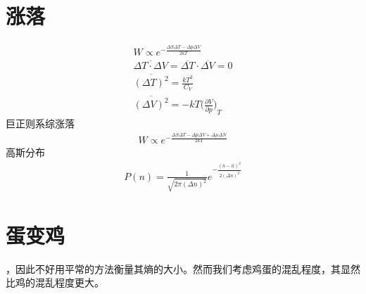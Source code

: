 \documentclass[a4paper,12pt]{article}
\newcommand{\myPartial}[3]{{\bigg(\frac{\partial {#1}}{\partial {#2}}\bigg)}_{#3}}
\begin{document}
\begin{CJK*}{UTF8}{gbsn}
\begin{spacing}{1.3}
\section{涨落}
\begin{align}
  W \propto e^{-\frac{\Delta S\Delta T - \Delta p\Delta V}{2kT}}\\
  \overline{\Delta T\cdot\Delta V} = \overline{\Delta T}\cdot\overline{\Delta V} = 0\\
  \overline{(\Delta T)^2} = \frac{kT^2}{C_V}\\
  \overline{(\Delta V)^2} = -kT\myPartial{V}{p}{T}
\end{align}
\indent 巨正则系综涨落
\begin{align}
    W \propto e^{-\frac{\Delta S\Delta T - \Delta p\Delta V +\Delta\mu\Delta N}{2kT}}
\end{align}
\indent 高斯分布
\begin{align}
  P(n) = \frac{1}{\sqrt{2\pi(\Delta n)^2}}e^{-\frac{(n-\bar{n})^2}{2\overline{(\Delta n)^2}}}
\end{align}


\section{蛋变鸡}
，因此不好用平常的方法衡量其熵的大小。然而我们考虑鸡蛋的混乱程度，其显然比鸡的混乱程度更大。



\end{spacing}
\end{CJK*}
\end{document}
